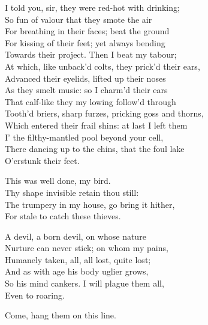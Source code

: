 \begin{verse_speech}[Ariel] 
I told you, sir, they were red-hot with drinking;\\
So fun of valour that they smote the air\\
For breathing in their faces; beat the ground\\
For kissing of their feet; yet always bending\\
Towards their project. Then I beat my tabour;\\
At which, like unback'd colts, they prick'd their ears,\\
Advanced their eyelids, lifted up their noses\\
As they smelt music: so I charm'd their ears\\
That calf-like they my lowing follow'd through\\
Tooth'd briers, sharp furzes, pricking goss and thorns,\\
Which entered their frail shins: at last I left them\\
I' the filthy-mantled pool beyond your cell,\\
There dancing up to the chins, that the foul lake\\
O'erstunk their feet.
\end{verse_speech}

\begin{verse_speech}[Prospero] 
This was well done, my bird.\\
Thy shape invisible retain thou still:\\
The trumpery in my house, go bring it hither,\\
For stale to catch these thieves.
\end{verse_speech}



\begin{verse_speech}[Prospero] 
A devil, a born devil, on whose nature\\
Nurture can never stick; on whom my pains,\\
Humanely taken, all, all lost, quite lost;\\
And as with age his body uglier grows,\\
So his mind cankers. I will plague them all,\\
Even to roaring.


Come, hang them on this line.

\end{verse_speech}

